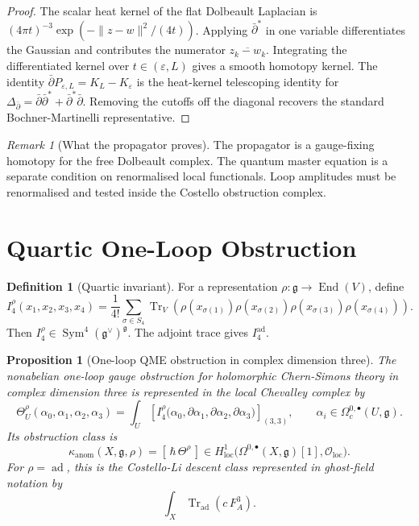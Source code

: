\documentclass[11pt]{amsart}
\providecommand{\dbar}{\bar{\partial}}
\providecommand{\dbarstar}{\bar{\partial}^{\ast}}
\providecommand{\fg}{\mathfrak{g}}
\providecommand{\ad}{\operatorname{ad}}
\providecommand{\Tr}{\operatorname{Tr}}
\providecommand{\Sym}{\operatorname{Sym}}
\providecommand{\End}{\operatorname{End}}
\providecommand{\cO}{\mathcal{O}}
\providecommand{\kanom}{\kappa_{\operatorname{anom}}}
\theoremstyle{plain}
\newtheorem{proposition}[theorem]{Proposition}
\theoremstyle{definition}
\newtheorem{definition}[theorem]{Definition}
\theoremstyle{remark}
\newtheorem{remark}[theorem]{Remark}
\begin{document}
\begin{proof}
The scalar heat kernel of the flat Dolbeault Laplacian is
$(4\pi t)^{-3}\exp(-\|z-w\|^2/(4t))$.  Applying $\dbarstar$ in one
variable differentiates the Gaussian and contributes the numerator
$\overline{z_k-w_k}$.  Integrating the differentiated kernel over
$t\in(\varepsilon,L)$ gives a smooth homotopy kernel.  The identity
$\dbar P_{\varepsilon,L}=K_L-K_\varepsilon$ is the heat-kernel
telescoping identity for $\Delta_{\dbar}=\dbar\dbarstar+\dbarstar\dbar$.
Removing the cutoffs off the diagonal recovers the standard
Bochner-Martinelli representative.
\end{proof}

\begin{remark}[What the propagator proves]
\label{rem:propagator-scope}
The propagator is a gauge-fixing homotopy for the free Dolbeault
complex.  The quantum master equation is a separate condition on
renormalised local functionals. Loop amplitudes must be renormalised and
tested inside the Costello obstruction complex.
\end{remark}

\section{Quartic One-Loop Obstruction}
\label{sec:quartic-obstruction}

\begin{definition}[Quartic invariant]
\label{def:quartic-invariant}
For a representation $\rho:\fg\to\End(V)$, define
\[
  I_4^\rho(x_1,x_2,x_3,x_4)
  =
  \frac1{4!}\sum_{\sigma\in S_4}
  \Tr_V\!\left(
    \rho(x_{\sigma(1)})\rho(x_{\sigma(2)})
    \rho(x_{\sigma(3)})\rho(x_{\sigma(4)})
  \right).
\]
Then $I_4^\rho\in\Sym^4(\fg^\vee)^\fg$.  The adjoint trace gives
$I_4^{\ad}$.
\end{definition}

\begin{proposition}[One-loop QME obstruction in complex dimension three]
\label{prop:qme-obstruction}
The nonabelian one-loop gauge obstruction for holomorphic
Chern-Simons theory in complex dimension three is represented in the
local Chevalley complex by
\[
  \Theta^\rho_U(\alpha_0,\alpha_1,\alpha_2,\alpha_3)
  =
  \int_U
  \left[
  I_4^\rho\bigl(
    \alpha_0,\partial\alpha_1,\partial\alpha_2,\partial\alpha_3
  \bigr)
  \right]_{(3,3)},
  \qquad
  \alpha_i\in\Omega^{0,\bullet}_c(U,\fg).
\]
Its obstruction class is
\[
  \kanom(X,\fg,\rho)
  =
  [\,\hbar\,\Theta^\rho\,]
  \in
  H^1_{\mathrm{loc}}
  \bigl(\Omega^{0,\bullet}(X,\fg)[1],\cO_{\mathrm{loc}}\bigr).
\]
For $\rho=\ad$, this is the Costello-Li descent class represented in
ghost-field notation by
\[
  \int_X \Tr_{\ad}(c\,F_A^3).
\]
\end{proposition}
\end{document}
